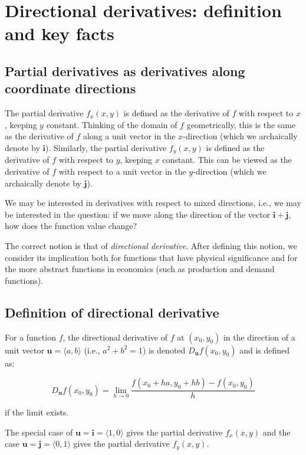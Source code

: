 \documentclass[10pt]{amsart}
\begin{document}
\section{Directional derivatives: definition and key facts}

\subsection{Partial derivatives as derivatives along coordinate directions}

The partial derivative $f_x(x,y)$ is defined as the derivative of $f$
with respect to $x$, keeping $y$ constant. Thinking of the domain of
$f$ geometrically, this is the same as the derivative of $f$ along a
unit vector in the $x$-direction (which we archaically denote by
$\mathbf{i}$). Similarly, the partial derivative $f_y(x,y)$ is defined
as the derivative of $f$ with respect to $y$, keeping $x$
constant. This can be viewed as the derivative of $f$ with respect to
a unit vector in the $y$-direction (which we archaically denote by
$\mathbf{j}$).

We may be interested in derivatives with respect to mixed directions,
i.e., we may be interested in the question: if we move along the
direction of the vector $\mathbf{i} + \mathbf{j}$, how does the
function value change?

The correct notion is that of {\em directional derivative}. After
defining this notion, we consider its implication both for functions
that have physical significance and for the more abstract functions in
economics (such as production and demand functions).

\subsection{Definition of directional derivative}

For a function $f$, the directional derivative of $f$ at $(x_0,y_0)$
in the direction of a unit vector $\mathbf{u} = \langle a,b \rangle$
(i.e., $a^2 + b^2 = 1$) is denoted $D_{\mathbf{u}}f(x_0,y_0)$ and is
defined as:

$$D_{\mathbf{u}}f(x_0,y_0) = \lim_{h \to 0} \frac{f(x_0 + ha,y_0 + hb) - f(x_0,y_0)}{h}$$

if the limit exists.

The special case of $\mathbf{u} = \mathbf{i} = \langle 1,0 \rangle$
gives the partial derivative $f_x(x,y)$ and the case $\mathbf{u} =
\mathbf{j} = \langle 0,1 \rangle$ gives the partial derivative
$f_y(x,y)$.
\end{document}
